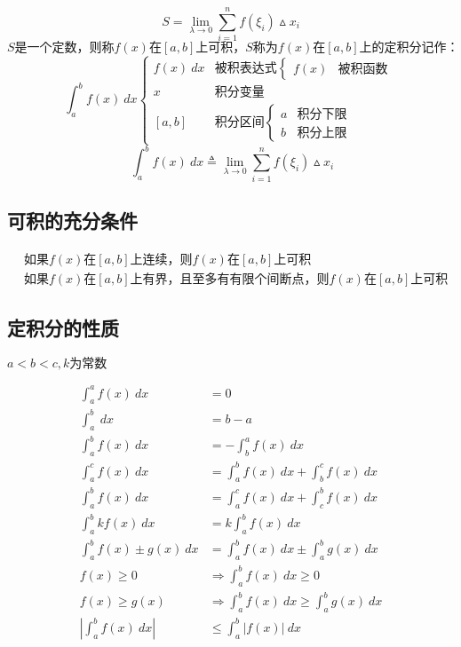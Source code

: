 	$$S=\lim\limits_{\lambda \to 0}\sum\limits_{i=1}^{n}f(\xi_i)\vartriangle x_i$$
	$$S\mbox{是一个定数，则称}f(x)\mbox{在}\left[a,b\right]\mbox{上可积，}S\mbox{称为}f(x)\mbox{在}\left[a,b\right]\mbox{上的定积分记作：}$$
	$$\int_{a}^{b}f(x)\ dx\begin{cases}
		f(x) \ dx &\mbox{被积表达式}\begin{cases}
			f(x) &\mbox{被积函数}
		\end{cases}\\
		x &\mbox{积分变量}\\
		\left[a,b\right]&\mbox{积分区间}\begin{cases}
				a &\mbox{积分下限}\\  
			b &\mbox{积分上限}
		\end{cases}
	\end{cases}$$
	$$\ \int_{a}^{b}f(x) \ dx\triangleq\lim\limits_{\lambda \to 0}\sum_{i=1}^{n}f(\xi_i)\vartriangle x_i$$
\subsection{可积的充分条件}
	\begin{align}
			&\mbox{如果}f(x)\mbox{在}\left[a,b\right]\mbox{上连续，则}f(x)\mbox{在}\left[a,b\right]\mbox{上可积}\\
			&\mbox{如果}f(x)\mbox{在}\left[a,b\right]\mbox{上有界，且至多有有限个间断点，则}f(x)\mbox{在}\left[a,b\right]\mbox{上可积}
	\end{align}
\subsection{定积分的性质}
	\centerline{$a<b<c,k\mbox{为常数}$}
	\begin{align}	
		\int_{a}^{a}f(x)\ dx&=0 \label{Definite_integral_property_1}\\
		\int_{a}^{b}\ dx &=b-a \label{Definite_integral_property_2}\\
		\int_{a}^{b}f(x)\ dx&=-\int_{b}^{a}f(x)\ dx \label{Definite_integral_property_3}\\
		\int_{a}^{c}f(x)\ dx&=\int_{a}^{b} f(x)\ dx+\int_{b}^{c}f(x)\ dx \label{Definite_integral_property_4}\\
		\int_{a}^{b}f(x)\ dx&=\int_{a}^{c}f(x)\ dx+\int_{c}^{b}f(x)\ dx \label{Definite_integral_property_5}\\
		\int_{a}^{b}kf(x)\ dx&=k\int_{a}^{b}f(x)\ dx \label{Definite_integral_property_6}\\
		\int_{a}^{b}f(x)\pm g(x)\ dx&=\int_{a}^{b}f(x)\ dx\pm \int_{a}^{b}g(x)\ dx\label{Definite_integral_property_7} \\
		f(x)\geqslant 0\quad &\Rightarrow \int_{a}^{b}f(x)\ dx\geqslant 0 \label{Definite_integral_property_8}\\
		f(x)\geqslant g(x)\quad &\Rightarrow \int_{a}^{b}f(x)\ dx\geqslant \int_{a}^{b}g(x)\ dx \label{Definite_integral_property_9}\\
		\left|\int_{a}^{b}f(x) \ dx\right|&\leqslant \int_{a}^{b}\left|f(x)\right|\ dx \label{Definite_integral_property_10}
	\end{align}
